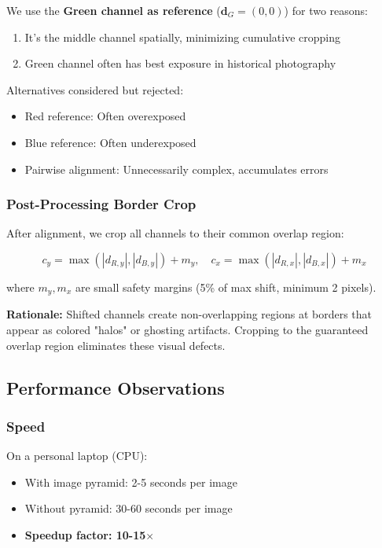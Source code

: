 \documentclass[11pt]{article}
\begin{document}
We use the \textbf{Green channel as reference} ($\mathbf{d}_G = (0,0)$) for two reasons:
\begin{enumerate}
\item It's the middle channel spatially, minimizing cumulative cropping
\item Green channel often has best exposure in historical photography
\end{enumerate}

Alternatives considered but rejected:
\begin{itemize}
\item Red reference: Often overexposed
\item Blue reference: Often underexposed
\item Pairwise alignment: Unnecessarily complex, accumulates errors
\end{itemize}

\subsubsection{Post-Processing Border Crop}

After alignment, we crop all channels to their common overlap region:

\begin{equation}
c_y = \max(|d_{R,y}|, |d_{B,y}|) + m_y, \quad c_x = \max(|d_{R,x}|, |d_{B,x}|) + m_x
\end{equation}

where $m_y, m_x$ are small safety margins (5\% of max shift, minimum 2 pixels).

\textbf{Rationale:} Shifted channels create non-overlapping regions at borders that appear as colored "halos" or ghosting artifacts. Cropping to the guaranteed overlap region eliminates these visual defects.

\subsection{Performance Observations}

\subsubsection{Speed}

On a personal laptop (CPU):
\begin{itemize}
\item With image pyramid: 2-5 seconds per image
\item Without pyramid: 30-60 seconds per image
\item \textbf{Speedup factor: 10-15$\times$}
\end{itemize}
\end{document}
